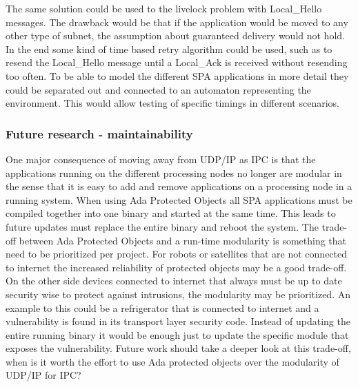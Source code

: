 The same solution could be used to the livelock problem with Local\_Hello
messages. The drawback would be that if the application would be moved to any
other type of subnet, the assumption about guaranteed delivery would not hold.
In the end some kind of time based retry algorithm could be used, such as to
resend the Local\_Hello message until a Local\_Ack is received without
resending too often. To be able to model the different SPA applications in more
detail they could be separated out and connected to an automaton representing
the environment.  This would allow testing of specific timings in different
scenarios.

%

\subsubsection{Future research - maintainability}
One major consequence of moving away from UDP/IP as IPC is that the
applications running on the different processing nodes no longer are modular in
the sense that it is easy to add and remove applications on a processing node
in a running system. When using Ada Protected Objects all SPA applications must
be compiled together into one binary and started at the same time. This leads
to future updates must replace the entire binary and reboot the system. The
trade-off between Ada Protected Objects and a run-time modularity is something
that need to be prioritized per project. For robots or satellites that are not
connected to internet the increased reliability of protected objects may be a
good trade-off. On the other side devices connected to internet that always
must be up to date security wise to protect against intrusions, the modularity
may be prioritized.  An example to this could be a refrigerator that is
connected to internet and a vulnerability is found in its transport layer
security code. Instead of updating the entire running binary it would be enough
just to update the specific module that exposes the vulnerability. Future work
should take a deeper look at this trade-off, when is it worth the effort to use
Ada protected objects over the modularity of UDP/IP for IPC?


